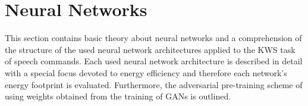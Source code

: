 
\chapter{Neural Networks}\label{sec:nn}
This section contains basic theory about neural networks and a comprehension of the structure of the used neural network architectures applied to the KWS task of speech commands.
Each used neural network architecture is described in detail with a special focus devoted to energy efficiency and therefore each network's energy footprint is evaluated.
Furthermore, the adversarial pre-training scheme of using weights obtained from the training of GANs is outlined.





